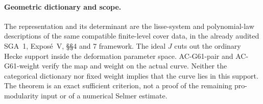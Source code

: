 \paragraph{Geometric dictionary and scope.}
The representation and its determinant are the lisse-system and
polynomial-law descriptions of the same compatible finite-level cover data,
in the already audited SGA~1, Expos\'e~V, \S\S4 and 7
framework.  The ideal \(J\) cuts out the ordinary Hecke support
inside the deformation parameter space.  AC-G61-pair and
AC-G61-weight verify the map and weight on the actual curve.
Neither the categorical dictionary nor fixed weight implies
that the curve lies in this support.  The theorem is an exact
sufficient criterion, not a proof of the remaining pro-modularity
input or of a numerical Selmer estimate.
